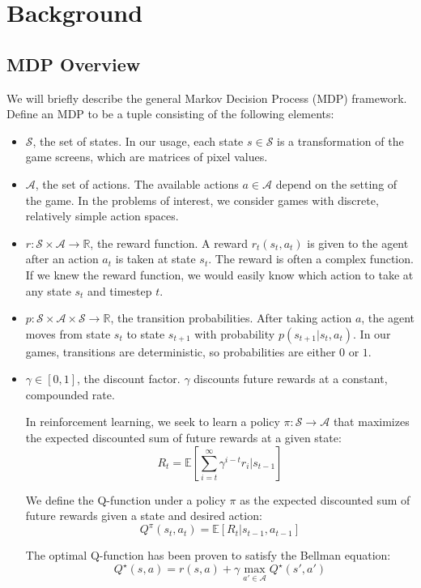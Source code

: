 \documentclass[11pt]{article}
\begin{document}
\section{Background}

\subsection{MDP Overview}

We will briefly describe the general Markov Decision Process (MDP)
framework. Define an MDP to be a tuple consisting of the following elements:

\begin{itemize}
    \item $\mathcal{S}$, the set of states. In our usage, each state $s \in \mathcal{S}$ is a transformation of the game screens, which are matrices of pixel values.
      
    \item $\mathcal{A}$, the set of actions. The available actions $a \in \mathcal{A}$
    depend on the setting of the game. In the problems of interest, we
    consider games with discrete, relatively simple action spaces.
      
    \item $r: \mathcal{S} \times \mathcal{A} \to \mathbb{R}$, the reward
    function. A reward $r_t(s_t, a_t)$ is given to the agent after an
    action $a_t$ is taken at state $s_t$. The reward is often a complex
    function. If we knew the reward function, we would easily know which
    action to take at any state $s_t$ and timestep $t$.
      
    \item $p: \mathcal{S} \times \mathcal{A} \times \mathcal{S} \to
    \mathbb{R}$, the transition probabilities. After taking action $a$, the agent moves from state $s_t$ to state $s_{t+1}$ with probability $p(s_{t+1} |s_t,
    a_t)$. In our games, transitions are deterministic, so probabilities
    are either $0$ or $1$.
      
    \item $\gamma \in [0, 1]$, the discount factor. $\gamma$ discounts
    future rewards at a constant, compounded rate.
    
    In reinforcement learning, we seek to learn a policy
    $\pi: \mathcal{S} \to \mathcal{A}$ that maximizes the expected
    discounted sum of future rewards at a given state:
    $$R_t = \mathbb{E}\left[\sum_{i=t}^\infty \gamma^{i-t} r_{i}|s_{t-1}\right]$$
    
    We define the Q-function under a policy $\pi$ as the expected
    discounted sum of future rewards given a state and desired action:
    $$Q^\pi(s_t, a_t) = \mathbb{E}\left[R_t | s_{t-1}, a_{t-1} \right]$$
    
    The optimal Q-function has been proven to satisfy the Bellman equation:
    $$Q^\star(s, a) = r(s, a) + \gamma \max_{a' \in \mathcal{A}} Q^\star(s', a')$$
\end{itemize}
\end{document}
